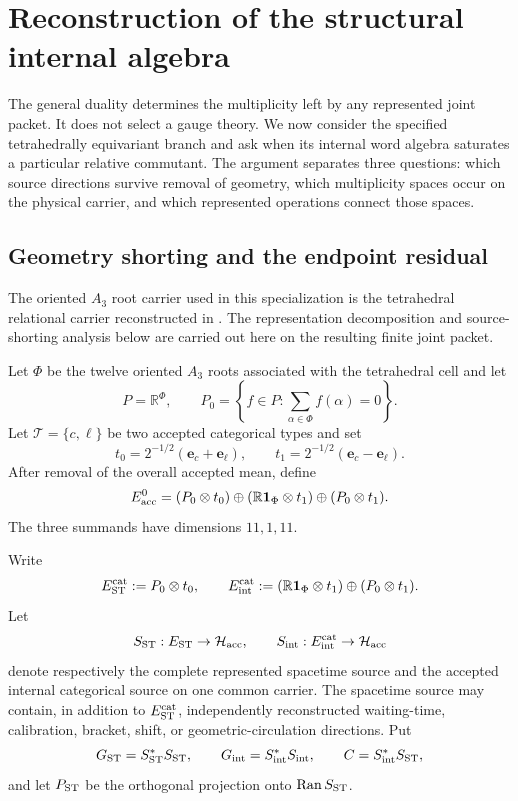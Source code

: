 \documentclass[11pt]{article}
\numberwithin{equation}{section}
\theoremstyle{definition}
\theoremstyle{remark}
\newcommand{\R}{\mathbb R}
\newcommand{\one}{\mathbf 1}
\newcommand{\Ran}{\operatorname{Ran}}
\newcommand{\Hh}{\mathcal H}
\begin{document}
\section{Reconstruction of the structural internal algebra}
\label{sec:internal-algebra}

The general duality determines the multiplicity left by any represented
joint packet.  It does not select a gauge theory.  We now consider the
specified tetrahedrally equivariant branch and ask when its internal word
algebra saturates a particular relative commutant.  The argument separates
three questions: which source directions survive removal of geometry, which
multiplicity spaces occur on the physical carrier, and which represented
operations connect those spaces.


\subsection{Geometry shorting and the endpoint residual}

The oriented $A_3$ root carrier used in this specialization is the tetrahedral
relational carrier reconstructed in \cite{PelissierSpacetime2026}.  The
representation decomposition and source-shorting analysis below are carried
out here on the resulting finite joint packet.

Let $\Phi$ be the twelve oriented $A_3$ roots associated with the tetrahedral
cell and let
\[
P=\R^\Phi,
\qquad
P_0=\left\{f\in P:\sum_{\alpha\in\Phi}f(\alpha)=0\right\}.
\]
Let $\mathscr T=\{c,\ell\}$ be two accepted categorical types and set
\[
t_0=2^{-1/2}(\mathbf e_c+\mathbf e_\ell),
\qquad
t_1=2^{-1/2}(\mathbf e_c-\mathbf e_\ell).
\]
After removal of the overall accepted mean, define
\begin{equation}
E_{\rm acc}^0
=
(P_0\otimes t_0)
\oplus
(\R\one_\Phi\otimes t_1)
\oplus
(P_0\otimes t_1).
\label{eq:accepted-residual}
\end{equation}
The three summands have dimensions $11,1,11$.

Write
\[
E_{\rm ST}^{\rm cat}:=P_0\otimes t_0,
\qquad
E_{\rm int}^{\rm cat}
:=(\R\one_\Phi\otimes t_1)\oplus(P_0\otimes t_1).
\]
Let
\[
S_{\rm ST}:E_{\rm ST}\to\Hh_{\rm acc},
\qquad
S_{\rm int}:E_{\rm int}^{\rm cat}\to\Hh_{\rm acc}
\]
denote respectively the complete represented spacetime source and the accepted
internal categorical source on one common carrier.  The spacetime source may
contain, in addition to $E_{\rm ST}^{\rm cat}$, independently reconstructed
waiting-time, calibration, bracket, shift, or geometric-circulation directions.
Put
\[
G_{\rm ST}=S_{\rm ST}^*S_{\rm ST},
\qquad
G_{\rm int}=S_{\rm int}^*S_{\rm int},
\qquad
C=S_{\rm int}^*S_{\rm ST},
\]
and let $P_{\rm ST}$ be the orthogonal projection onto $\Ran S_{\rm ST}$.
\end{document}
